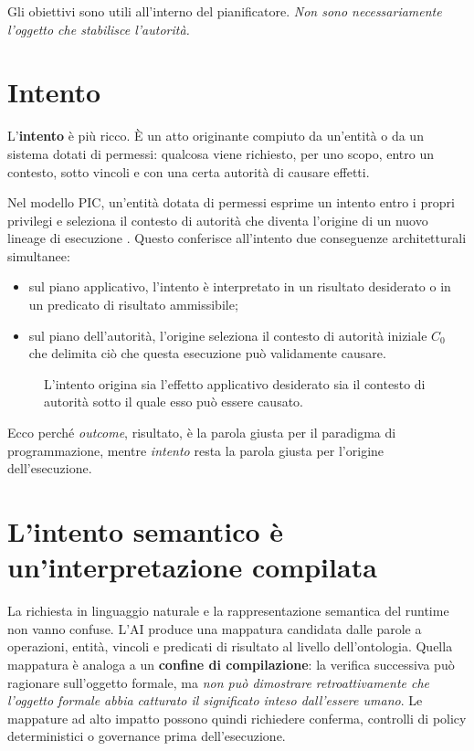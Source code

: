 \documentclass[10pt,oneside,openany]{book}
\newcommand{\term}[1]{\textbf{#1}}
\begin{document}
Gli obiettivi sono utili all'interno del pianificatore. \emph{Non sono necessariamente l'oggetto che stabilisce l'autorità.}

\section{Intento}
L'\term{intento} è più ricco. È un atto originante compiuto da un'entità o da un sistema dotati di permessi: qualcosa viene richiesto, per uno scopo, entro un contesto, sotto vincoli e con una certa autorità di causare effetti.

Nel modello PIC, un'entità dotata di permessi esprime un intento entro i propri privilegi e seleziona il contesto di autorità che diventa l'origine di un nuovo lineage di esecuzione \cite{gallo2026pic}. Questo conferisce all'intento due conseguenze architetturali simultanee:

\begin{itemize}
\item sul piano applicativo, l'intento è interpretato in un risultato desiderato o in un predicato di risultato ammissibile;
\item sul piano dell'autorità, l'origine seleziona il contesto di autorità iniziale $C_0$ che delimita ciò che questa esecuzione può validamente causare.
\end{itemize}

\begin{figure}[ht]
\centering
{}
\caption{L'intento origina sia l'effetto applicativo desiderato sia il contesto di autorità sotto il quale esso può essere causato.}
\end{figure}

Ecco perché \emph{outcome}, risultato, è la parola giusta per il paradigma di programmazione, mentre \emph{intento} resta la parola giusta per l'origine dell'esecuzione.

\section{L'intento semantico è un'interpretazione compilata}
La richiesta in linguaggio naturale e la rappresentazione semantica del runtime non vanno confuse. L'AI produce una mappatura candidata dalle parole a operazioni, entità, vincoli e predicati di risultato al livello dell'ontologia. Quella mappatura è analoga a un \term{confine di compilazione}: la verifica successiva può ragionare sull'oggetto formale, ma \emph{non può dimostrare retroattivamente che l'oggetto formale abbia catturato il significato inteso dall'essere umano}. Le mappature ad alto impatto possono quindi richiedere conferma, controlli di policy deterministici o governance prima dell'esecuzione.
\end{document}
